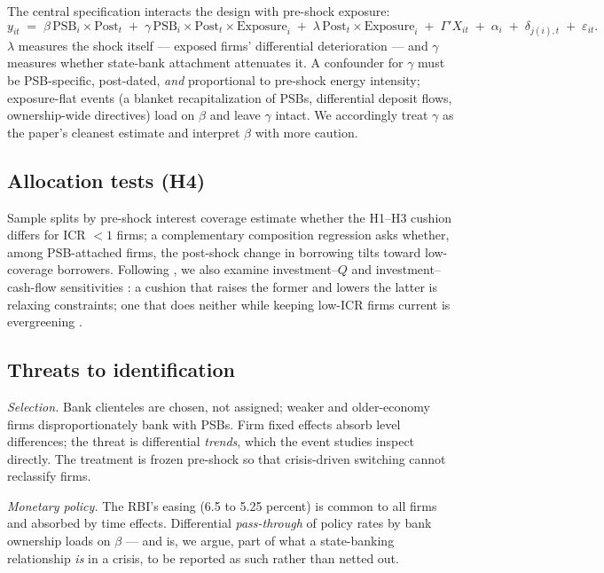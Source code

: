 \documentclass[12pt]{article}
\begin{document}
The central specification interacts the design with pre-shock exposure:
\begin{equation}
y_{it} \;=\; \beta\,\text{PSB}_i \times \text{Post}_t
\;+\; \gamma\,\text{PSB}_i \times \text{Post}_t \times \text{Exposure}_i
\;+\; \lambda\,\text{Post}_t \times \text{Exposure}_i
\;+\; \Gamma' X_{it} \;+\; \alpha_i \;+\; \delta_{j(i),t} \;+\; \varepsilon_{it}.
\label{eq:ddd}
\end{equation}
$\lambda$ measures the shock itself --- exposed firms' differential deterioration ---
and $\gamma$ measures whether state-bank attachment attenuates it. A confounder for
$\gamma$ must be PSB-specific, post-dated, \emph{and} proportional to pre-shock energy
intensity; exposure-flat events (a blanket recapitalization of PSBs, differential deposit
flows, ownership-wide directives) load on $\beta$ and leave $\gamma$ intact. We accordingly
treat $\gamma$ as the paper's cleanest estimate and interpret $\beta$ with more caution.

\subsection{Allocation tests (H4)}

Sample splits by pre-shock interest coverage estimate whether the H1--H3 cushion differs
for ICR $<1$ firms; a complementary composition regression asks whether, among PSB-attached
firms, the post-shock change in borrowing tilts toward low-coverage borrowers. Following
\citet{lin2015government}, we also examine investment--$Q$ and investment--cash-flow
sensitivities \citep{fazzari1988}: a cushion that raises the former and lowers the latter
is relaxing constraints; one that does neither while keeping low-ICR firms current is
evergreening \citep{peek2005,caballero2008}.

\subsection{Threats to identification}\label{sec:threats}

\emph{Selection.} Bank clienteles are chosen, not assigned; weaker and older-economy firms
disproportionately bank with PSBs. Firm fixed effects absorb level differences; the threat
is differential \emph{trends}, which the event studies inspect directly. The treatment is
frozen pre-shock so that crisis-driven switching cannot reclassify firms.

\emph{Monetary policy.} The RBI's easing (6.5 to 5.25 percent) is common to all firms and
absorbed by time effects. Differential \emph{pass-through} of policy rates by bank
ownership loads on $\beta$ --- and is, we argue, part of what a state-banking relationship
\emph{is} in a crisis, to be reported as such rather than netted out.
\end{document}
